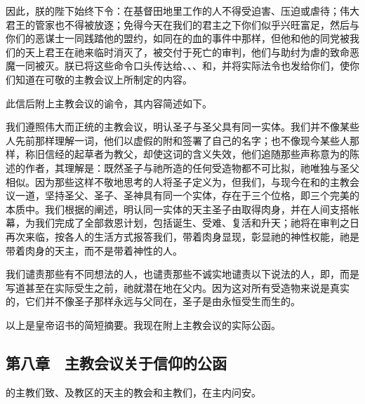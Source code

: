 因此，朕的陛下始终下令：在基督田地里工作的人不得受迫害、压迫或虐待；伟大君王的管家也不得被放逐；免得今天在我们的君主之下你们似乎兴旺富足，然后与你们的恶谋士一同践踏他的盟约，如同在的血的事件中那样，但他和他的同党被我们的天上君王在祂来临时消灭了，被交付于死亡的审判，他们与助纣为虐的致命恶魔一同被灭。朕已将这些命令口头传达给、、、和，并将实际法令也发给你们，使你们知道在可敬的主教会议上所制定的内容。\par

此信后附上主教会议的谕令，其内容简述如下。\par

我们遵照伟大而正统的主教会议，明认圣子与圣父具有同一实体。我们并不像某些人先前那样理解一词，他们以虚假的附和签署了自己的名字；也不像现今某些人那样，称旧信经的起草者为教父，却使这词的含义失效，他们追随那些声称意为的陈述的作者，其理解是：既然圣子与祂所造的任何受造物都不可比拟，祂唯独与圣父相似。因为那些这样不敬地思考的人将圣子定义为，但我们，与现今在和的主教会议一道，坚持圣父、圣子、圣神具有同一个实体，存在于三个位格，即三个完美的本质中。我们根据的阐述，明认同一实体的天主圣子由取得肉身，并在人间支搭帐幕，为我们完成了全部救恩计划，包括诞生、受难、复活和升天；祂将在审判之日再次来临，按各人的生活方式报答我们，带着肉身显现，彰显祂的神性权能，祂是带着肉身的天主，而不是带着神性的人。\par

我们谴责那些有不同想法的人，也谴责那些不诚实地谴责以下说法的人，即，而是写道甚至在实际受生之前，祂就潜在地在父内。因为这对所有受造物来说是真实的，它们并不像圣子那样永远与父同在，圣子是由永恒受生而生的。\par

以上是皇帝诏书的简短摘要。我现在附上主教会议的实际公函。\par


\subsection{第八章　主教会议关于信仰的公函}

的主教们致、及教区的天主的教会和主教们，在主内问安。\par

